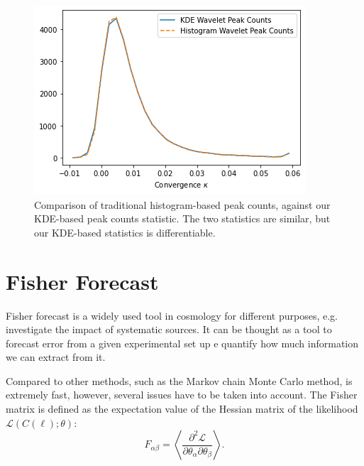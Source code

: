 \documentclass[twocolumn,twocolappendix]{aastex63}
\begin{document}
\begin{figure}
    \centering
    \includegraphics[width=\columnwidth]{figures/peakcounts.png}
    \caption{Comparison of traditional histogram-based peak counts, against our  KDE-based peak counts statistic. The two statistics are similar, but our KDE-based statistics is differentiable.}
    \label{fig:comp_statistics}
\end{figure}

\section{Fisher Forecast}
Fisher forecast is a widely used tool in cosmology for different purposes, e.g. investigate the impact of systematic sources. It can be thought as a tool to forecast error from a given experimental set up e quantify how much information we can extract from it. 

Compared to other methods, such as the Markov chain Monte Carlo method, is extremely fast, however, several issues have to be taken into account. 
The Fisher matrix is defined as the expectation value of the Hessian matrix of the likelihood $\mathcal{L}(C(\ell);\theta)$:
\begin{equation}
    F_{\alpha \beta}=\left \langle 
    \frac{\partial^2\mathcal{L}}
    {\partial \theta_{\alpha}\partial \theta_{\beta}}
    \right \rangle .
\end{equation}
\end{document}
